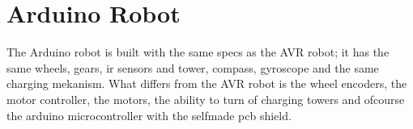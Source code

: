 \section{Arduino Robot}
The Arduino robot is built with the same specs as the AVR robot; it has the same wheels, gears, \acrshort{ir} sensors and tower, compass, gyroscope and the same charging mekanism. What differs from the AVR robot is the wheel encoders, the motor controller, the motors, the ability to turn of charging towers and ofcourse the arduino microcontroller with the selfmade \acrshort{pcb} shield. 

